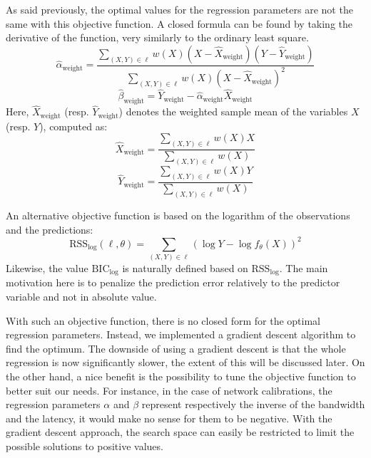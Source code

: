                 As said previously, the optimal values for the regression parameters are not the same with this
                objective function. A closed formula can be found by taking the derivative of the function, very
                similarly to the ordinary least square.
                \begin{equation}
                    \hat\alpha_\text{weight} = \frac{\sum_{(X,Y) \in \ell}
                    w(X)(X-\hat{X}_\text{weight})(Y-\hat{Y}_\text{weight})}
                    {\sum_{(X,Y) \in \ell} w(X)(X-\hat{X}_\text{weight})^2}
                \end{equation}
                \begin{equation}
                    \hat\beta_\text{weight} = \hat{Y}_\text{weight} - \hat{\alpha}_\text{weight}\hat{X}_\text{weight}
                \end{equation}
                Here, \(\hat{X}_\text{weight}\) (resp. \(\hat{Y}_\text{weight}\)) denotes the weighted sample mean of
                the variables \(X\) (resp. \(Y\)), computed as:
                \begin{equation}
                    \hat{X}_\text{weight} = \frac{\sum_{(X,Y)\in\ell}w(X)X}{\sum_{(X,Y)\in\ell}w(X)}
                \end{equation}
                \begin{equation}
                    \hat{Y}_\text{weight} = \frac{\sum_{(X,Y)\in\ell}w(X)Y}{\sum_{(X,Y)\in\ell}w(X)}
                \end{equation}

                An alternative objective function is based on the logarithm of the observations and the predictions:
                \begin{equation}
                    \text{RSS}_{\log}(\ell,\theta) = \sum_{(X,Y)\in\ell} (\log Y - \log f_\theta(X))^2
                \end{equation}
                Likewise, the value \(\text{BIC}_{\log}\) is naturally defined based on \(\text{RSS}_{\log}\). The main
                motivation here is to penalize the prediction error relatively to the predictor variable and not in
                absolute value.

                With such an objective function, there is no closed form for the optimal regression parameters. Instead,
                we implemented a gradient descent algorithm to find the optimum.
                The downside of using a gradient descent is that the whole regression is now significantly slower, the
                extent of this will be discussed later. On the other hand, a nice benefit is the possibility to tune the
                objective function to better suit our needs. For instance, in the case of network calibrations, the
                regression parameters \(\alpha\) and \(\beta\) represent respectively the inverse of the bandwidth and
                the latency, it would make no sense for them to be negative. With the gradient descent approach, the
                search space can easily be restricted to limit the possible solutions to positive values.


